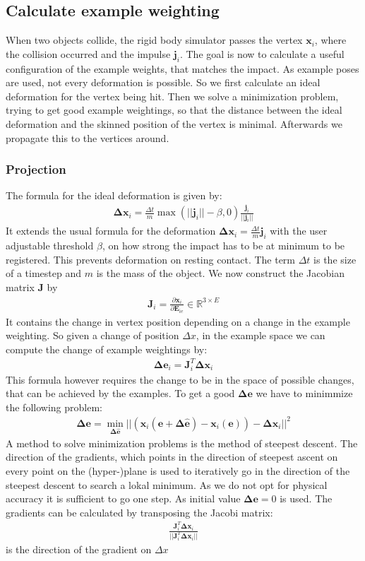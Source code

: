 \subsection{Calculate example weighting}
When two objects collide, the rigid body simulator passes the vertex $\bm{x}_i$, where the collision occurred and the impulse $\bm{j}_i$.
The goal is now to calculate a 	useful configuration of the example weights, that matches the impact. As example poses are used, not every deformation is possible. So we first calculate an ideal deformation for the vertex being hit. Then we solve a minimization problem, trying to get good example weightings, so that the distance between the ideal deformation and the skinned position of the vertex is minimal. Afterwards we propagate this to the vertices around.
\subsubsection{Projection}
The formula for the ideal deformation is given by:
\begin{align}
\bm{\Delta x}_i = \frac{\Delta t}{m} \max(||\bm{j}_i|| - \beta, 0) \frac{\bm j_i}{||\bm j_i||}
\end{align}
It extends the usual formula for the deformation $\bm{\Delta x}_i = \frac{\Delta t}{m} \bm j_i$ with the user adjustable threshold $\beta$, on how strong the impact has to be at minimum to be registered. This prevents deformation on resting contact.
The term $\Delta t$ is the size of a timestep and $m$ is the mass of the object.
We now construct the Jacobian matrix $\bm J$ by
\begin{align}
\bm J_i = \frac{\partial\bm x_i}{\partial \bm E_{ie}} \in \mathbb{R}^{3\times E}
\end{align}
It contains the change in vertex position depending on a change in the example weighting.
So given a change of position $\Delta x$, in the example space we can compute the change of example weightings by:
\begin{align}
\bm{\Delta e}_i = \bm J_i^T \bm{\Delta x}_i
\end{align}
This formula however requires the change to be in the space of possible changes, that can be achieved by the examples. To get a good $\bm{\Delta e}$ we have to minimmize the following problem:
\begin{align}
\bm{\Delta e} = \min_{\bm{\Delta \hat e}}||(\bm x_i (\bm e + \bm{\Delta \hat e}) -\bm x_i (\bm e )) - \bm{\Delta x}_i ||^2
\end{align}
A method to solve minimization problems is the method of steepest descent. The direction of the gradients, which points in the direction of steepest ascent on every point on the (hyper-)plane is used to iteratively go in the direction of the steepest descent to search a lokal minimum.
As we do not opt for physical accuracy it is sufficient to go one step. As initial value $\bm{\Delta e} = 0$ is used. The gradients can be calculated by transposing the Jacobi matrix:
\begin{align}
\frac{\bm J_i^T \bm{\Delta x}_i}{||\bm J_i^T \bm{\Delta x}_i||}
\end{align}
is the direction of the gradient on $\Delta x$


